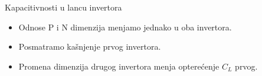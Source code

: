 \begin{frame}[label=09_3-s007]{Kapacitivnosti u lancu invertora}
\begin{itemize}
\item Odnose P i N dimenzija menjamo jednako u oba invertora.
\item Posmatramo kašnjenje \alert{prvog} invertora.
\item Promena dimenzija drugog invertora menja opterećenje $C_L$ prvog.
\end{itemize}\begin{center}

\end{center}
\end{frame}
